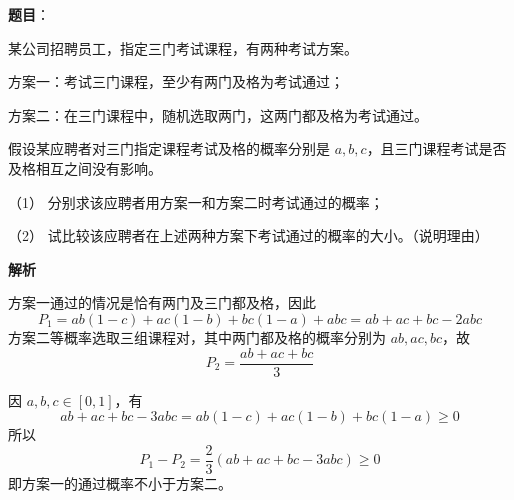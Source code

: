 \begin{answer}

\textbf{题目}：

某公司招聘员工，指定三门考试课程，有两种考试方案。

方案一：考试三门课程，至少有两门及格为考试通过；

方案二：在三门课程中，随机选取两门，这两门都及格为考试通过。

假设某应聘者对三门指定课程考试及格的概率分别是 $a,b,c$，且三门课程考试是否及格相互之间没有影响。

（1） 分别求该应聘者用方案一和方案二时考试通过的概率；

（2） 试比较该应聘者在上述两种方案下考试通过的概率的大小。（说明理由）

\textbf{解析}


方案一通过的情况是恰有两门及三门都及格，因此
\nopagebreak[4]
\[
P_1=ab(1-c)+ac(1-b)+bc(1-a)+abc=ab+ac+bc-2abc
\]
方案二等概率选取三组课程对，其中两门都及格的概率分别为 $ab,ac,bc$，故
\nopagebreak[4]
\[
P_2=\frac{ab+ac+bc}{3}
\]


因 $a,b,c\in[0,1]$，有
\nopagebreak[4]
\[
ab+ac+bc-3abc=ab(1-c)+ac(1-b)+bc(1-a)\ge0
\]
所以
\nopagebreak[4]
\[
P_1-P_2=\frac23(ab+ac+bc-3abc)\ge0
\]
即方案一的通过概率不小于方案二。



\end{answer}
